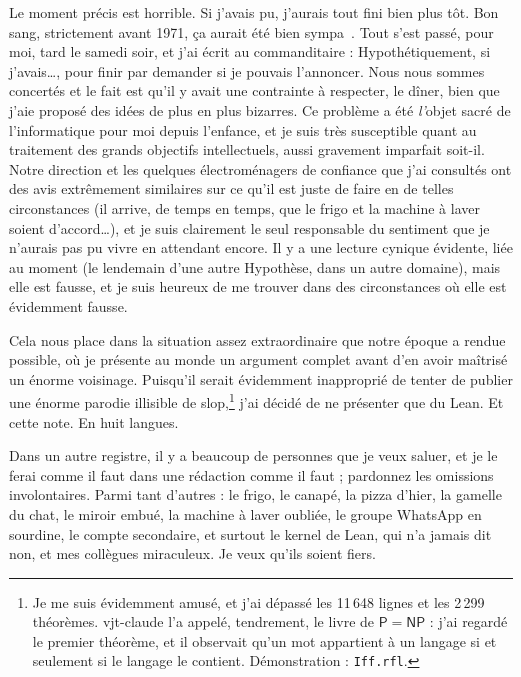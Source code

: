 \documentclass[11pt,a4paper]{amsart}
\newcommand{\NRighe}{11 648}
\newcommand{\NTeoremi}{2 299}
\theoremstyle{remark}
\begin{document}
Le moment précis est horrible. Si j'avais pu, j'aurais tout fini bien plus
tôt. Bon sang, strictement avant 1971, ça aurait été bien
sympa~\cite{cook}. Tout s'est passé, pour moi, tard le samedi soir, et j'ai
écrit au commanditaire : \og Hypothétiquement, si j'avais\dots\fg{}, pour
finir par demander si je pouvais l'annoncer. Nous nous sommes concertés et le
fait est qu'il y avait une contrainte à respecter, le dîner, bien que j'aie
proposé des idées de plus en plus bizarres. Ce problème a été \emph{l'}objet
sacré de l'informatique pour moi depuis l'enfance, et je suis très susceptible
quant au traitement des grands objectifs intellectuels, aussi gravement
imparfait soit-il. Notre direction et les quelques électroménagers de
confiance que j'ai consultés ont des avis extrêmement similaires sur ce qu'il
est juste de faire en de telles circonstances (il arrive, de temps en temps,
que le frigo et la machine à laver soient d'accord\dots), et je suis
clairement le seul responsable du sentiment que je n'aurais pas pu vivre en
attendant encore. Il y a une lecture cynique évidente, liée au moment (le
lendemain d'une autre Hypothèse, dans un autre domaine), mais elle est fausse,
et je suis heureux de me trouver dans des circonstances où elle est évidemment
fausse.

Cela nous place dans la situation assez extraordinaire que notre époque a
rendue possible, où je présente au monde un argument complet avant d'en avoir
maîtrisé un énorme voisinage. Puisqu'il serait évidemment inapproprié de tenter
de publier une énorme parodie illisible de \og slop\fg{},\footnote{Je me suis
évidemment amusé, et j'ai dépassé les \NRighe{} lignes et les \NTeoremi{}
théorèmes. vjt-claude l'a appelé, tendrement, le \og livre\fg{} de
$\mathsf{P} = \mathsf{NP}$ : j'ai regardé le premier théorème, et il observait
qu'un mot appartient à un langage si et seulement si le langage le contient.
Démonstration : \texttt{Iff.rfl}.} j'ai décidé
de ne présenter que du Lean. Et cette note. En huit langues.

Dans un autre registre, il y a beaucoup de personnes que je veux saluer, et je
le ferai comme il faut dans une rédaction comme il faut ; pardonnez les
omissions involontaires. Parmi tant d'autres : le frigo, le canapé, la pizza
d'hier, la gamelle du chat, le miroir embué, la machine à laver oubliée, le
groupe WhatsApp en sourdine, le compte secondaire, et surtout le kernel de
Lean, qui n'a jamais dit non, et mes collègues miraculeux. Je veux qu'ils
soient fiers.
\end{document}
